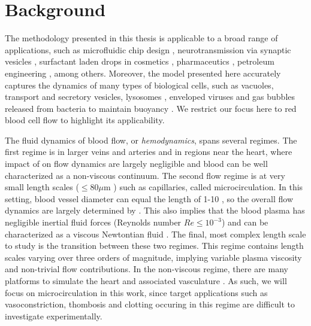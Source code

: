 \section{Background}
The methodology presented in this thesis is applicable to a broad range of applications, such as microfluidic chip design \cite{mcgrath2014deterministic}, neurotransmission via synaptic vesicles \cite{gan2018synaptic}, surfactant laden drops 
\cite{schramm20032,sorgentone2018highly} in cosmetics \cite{lourith2009natural}, pharmaceutics \cite{lourith2009natural}, petroleum engineering \cite{schramm2000surfactants}, among others.
Moreover, the model presented here accurately captures the dynamics of many types of biological cells, such as vacuoles, transport and secretory vesicles, lysosomes \cite{carreira2017development}, enveloped viruses \cite{barenholz1976enveloped} and gas bubbles released from bacteria to maintain buoyancy \cite{pfeifer2012distribution}.
We restrict our focus here to red blood cell flow \cite{Veerapaneni2009} to highlight its applicability.

The fluid dynamics of blood flow, or \textit{hemodynamics}, spans several regimes. 
The first regime is in larger veins and arteries and in regions near the heart, where impact of \rbcs on flow dynamics are largely negligible and blood can be well characterized as a non-viscous continuum. 
The second flow regime is at very small length scales ($\leq 80 \mu$m \cite{potter1983capillary}) such as capillaries, called microcirculation.
In this setting, blood vessel diameter can equal the length of 1-10 \rbcs \cite{potter1983capillary,linden2012hematopoietic}, so the overall flow dynamics are largely determined by \rbcs. 
This also implies that the blood plasma has negligible inertial fluid forces (Reynolds number $Re \leq 10^{-3}$) and can be characterized as a viscous Newtontian fluid \cite{cortinovis2006capillary}.
The final, most complex length scale to study is the transition between these two regimes.
This regime contains length scales varying over three orders of magnitude, implying variable plasma viscosity and non-trivial \rbc flow contributions.
In the non-viscous regime, there are many platforms to simulate the heart and associated vasculature \cite{randles2015massively,vigmond2008effect,peskin1977numerical,griffith2012immersed}.
As such, we will focus on microcirculation in this work, since target applications such as vasoconstriction, thombosis and clotting occuring in this regime are difficult to investigate experimentally.

